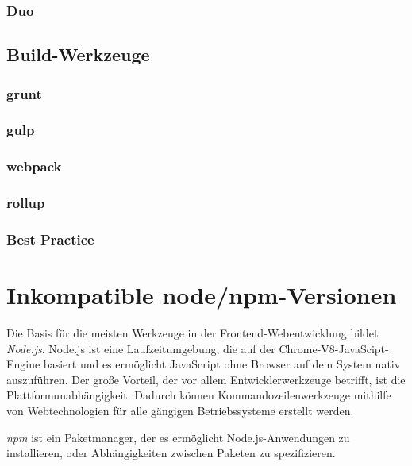 \subsubsection{Duo}
\label{sub:duo}



\subsection{Build-Werkzeuge}
\label{sub:build-tools}


\subsubsection{grunt}
\label{sub:grunt}
\subsubsection{gulp}
\label{sub:gulp}
\subsubsection{webpack}
\label{sub:webpack}
\subsubsection{rollup}
\label{sub:rollup}
\subsubsection{Best Practice}
\label{sub:build-tools-best-practices}


\section{Inkompatible node/npm-Versionen}
Die Basis für die meisten Werkzeuge in der Frontend-Webentwicklung bildet \emph{Node.js}.
Node.js ist eine Laufzeitumgebung, die auf der Chrome-V8-JavaScipt-Engine basiert und es ermöglicht JavaScript ohne Browser auf dem System nativ auszuführen.
Der große Vorteil, der vor allem Entwicklerwerkzeuge betrifft, ist die Plattformunabhängigkeit.
Dadurch können Kommandozeilenwerkzeuge mithilfe von Webtechnologien für alle gängigen Betriebssysteme erstellt werden.

\emph{npm} ist ein Paketmanager, der es ermöglicht Node.js-Anwendungen zu installieren, oder Abhängigkeiten zwischen Paketen zu spezifizieren.

